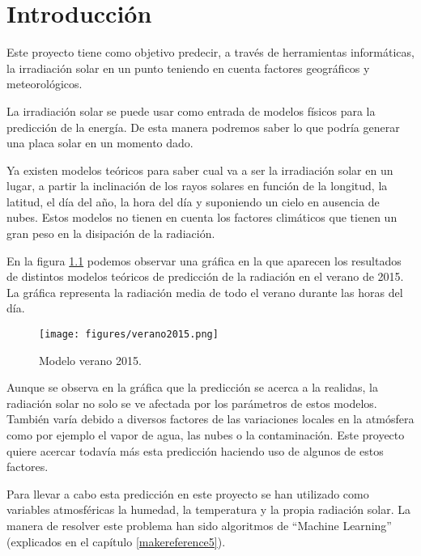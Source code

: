 \cleardoublepage

\chapter{Introducción}
\label{makereference1}

Este proyecto tiene como objetivo predecir, a través de herramientas informáticas, la irradiación solar en un punto teniendo en cuenta factores geográficos y meteorológicos.

La irradiación solar se puede usar como entrada de modelos físicos para la predicción de la energía. De esta manera podremos saber lo que podría generar una placa solar en un momento dado.

Ya existen modelos teóricos para saber cual va a ser la irradiación solar en un lugar, a partir la inclinación de los rayos solares en función de la longitud, la latitud, el día del año, la hora del día y suponiendo un cielo en ausencia de nubes. Estos modelos no tienen en cuenta los factores climáticos que tienen un gran peso en la disipación de la radiación.

En la figura \ref{modelo_verano} podemos observar una gráfica en la que aparecen los resultados de distintos modelos teóricos de predicción de la radiación en el verano de 2015. La gráfica representa la radiación media de todo el verano durante las horas del día.

\begin{figure}[htb]
	\begin{center}
		\texttt{[image: figures/verano2015.png]}
		\caption{Modelo verano 2015. \label{modelo_verano}} 
	\end{center}
\end{figure}

Aunque se observa en la gráfica que la predicción se acerca a la realidas, la radiación solar no solo se ve afectada por los parámetros de estos modelos. También varía debido a diversos factores de las variaciones locales en la atmósfera como por ejemplo el vapor de agua, las nubes o la contaminación. Este proyecto quiere acercar todavía más esta predicción haciendo uso de algunos de estos factores.

Para llevar a cabo esta predicción en este proyecto se han utilizado como variables atmosféricas la humedad, la temperatura y la propia radiación solar. La manera de resolver este problema han sido algoritmos de ``Machine Learning'' (explicados en el capítulo \ref{makereference5}).

